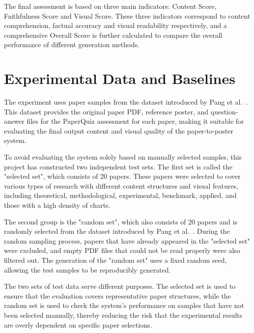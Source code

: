 \documentclass[12pt,oneside]{report}
\begin{document}
\vspace{1em}

The final assessment is based on three main indicators: Content Score, Faithfulness Score and Visual Score. These three indicators correspond to content comprehension, factual accuracy and visual readability respectively, and a comprehensive Overall Score is further calculated to compare the overall performance of different generation methods.

\section{Experimental Data and Baselines}

The experiment uses paper samples from the dataset introduced by Pang et al.~\cite{paper2poster}. This dataset provides the original paper PDF, reference poster, and question-answer files for the PaperQuiz assessment for each paper, making it suitable for evaluating the final output content and visual quality of the paper-to-poster system.

\vspace{1em}

To avoid evaluating the system solely based on manually selected samples, this project has constructed two independent test sets. The first set is called the "selected set", which consists of 20 papers. These papers were selected to cover various types of research with different content structures and visual features, including theoretical, methodological, experimental, benchmark, applied, and those with a high density of charts.

\vspace{1em}

The second group is the "random set", which also consists of 20 papers and is randomly selected from the dataset introduced by Pang et al.~\cite{paper2poster}. During the random sampling process, papers that have already appeared in the "selected set" were excluded, and empty PDF files that could not be read properly were also filtered out. The generation of the "random set" uses a fixed random seed, allowing the test samples to be reproducibly generated.

\vspace{1em}

The two sets of test data serve different purposes. The selected set is used to ensure that the evaluation covers representative paper structures, while the random set is used to check the system's performance on samples that have not been selected manually, thereby reducing the risk that the experimental results are overly dependent on specific paper selections.
\end{document}

